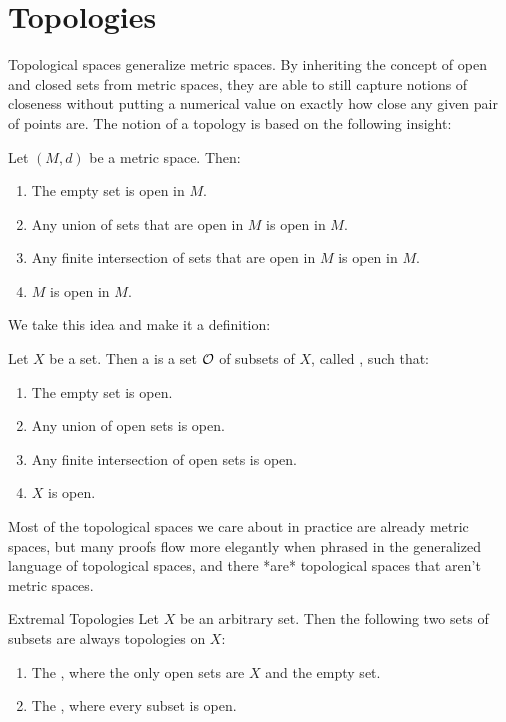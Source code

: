 \section{Topologies}
Topological spaces generalize metric spaces. By inheriting the concept of open and closed sets from metric spaces, they are able to still capture notions of closeness without putting a numerical value on exactly how close any given pair of points are. The notion of a topology is based on the following insight:
\begin{exercise}
	Let $(M,d)$ be a metric space. Then:
	\begin{enumerate}
		\item The empty set is open in $M$.
		\item Any union of sets that are open in $M$ is open in $M$.
		\item Any finite intersection of sets that are open in $M$ is open in $M$.
		\item $M$ is open in $M$.
	\end{enumerate}
\end{exercise}
We take this idea and make it a definition:
\begin{importantdefinition}{}{}
	Let $X$ be a set. Then a  is a set $\mathcal{O}$ of subsets of $X$, called , such that:
	\begin{enumerate}
		\item The empty set is open.
		\item Any union of open sets is open.
		\item Any finite intersection of open sets is open.
		\item $X$ is open.
	\end{enumerate}
\end{importantdefinition}
Most of the topological spaces we care about in practice are already metric spaces, but many proofs flow more elegantly when phrased in the generalized language of topological spaces, and there *are* topological spaces that aren't metric spaces.
\begin{importanttheorem}{Extremal Topologies}{}
	Let $X$ be an arbitrary set. Then the following two sets of subsets are always topologies on $X$:
	\begin{enumerate}
		\item The , where the only open sets are $X$ and the empty set.
		\item The , where every subset is open.
	\end{enumerate}
\end{importanttheorem}
